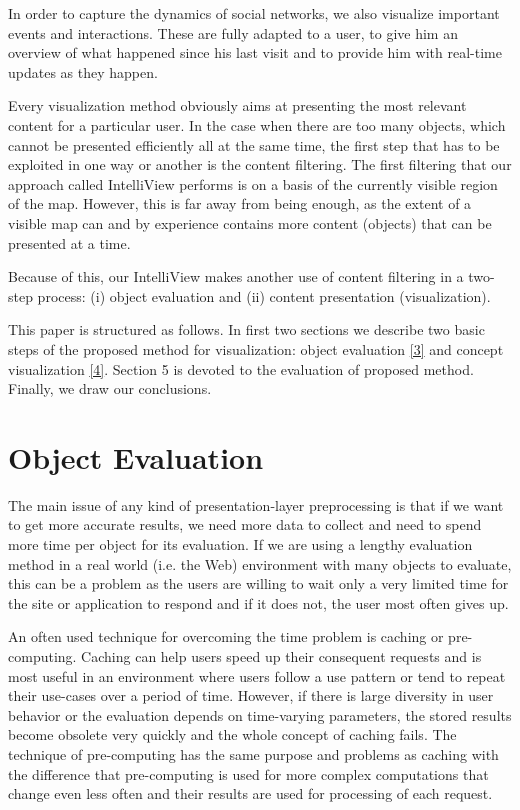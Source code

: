 \documentclass[10pt]{article}
\begin{document}
In order to capture the dynamics of social networks, we also visualize important events and interactions. These are fully adapted to a user, to give him an overview of what happened since his last visit and to provide him with real-time updates as they happen.

Every visualization method obviously aims at presenting the most relevant content for a particular user. In the case when there are too many objects, which cannot be presented efficiently all at the same time, the first step that has to be exploited in one way or another is the content filtering. The first filtering that our approach called IntelliView performs is on a basis of the currently visible region of the map. However, this is far away from being enough, as the extent of a visible map can and by experience contains more content (objects) that can be presented at a time.

Because of this, our IntelliView makes another use of content filtering in a two-step process: (i) object evaluation and (ii) content presentation (visualization).

This paper is structured as follows. In first two sections we describe two basic steps of the proposed method for visualization: object evaluation \ref{3} and concept visualization \ref{4}. Section 5 is devoted to the evaluation of proposed method. Finally, we draw our conclusions.



\section{Object Evaluation}
The main issue of any kind of presentation-layer preprocessing is that if we want to get more accurate results, we need more data to collect and need to spend more time per object for its evaluation. If we are using a lengthy evaluation method in a real world (i.e. the Web) environment with many objects to evaluate, this can be a problem as the users are willing to wait only a very limited time for the site or application to respond and if it does not, the user most often gives up.

An often used technique for overcoming the time problem is caching or pre-computing. Caching can help users speed up their consequent requests and is most useful in an environment where users follow a use pattern or tend to repeat their use-cases over a period of time. However, if there is large diversity in user behavior or the evaluation depends on time-varying parameters, the stored results become obsolete very quickly and the whole concept of caching fails. The technique of pre-computing has the same purpose and problems as caching with the difference that pre-computing is used for more complex computations that change even less often and their results are used for processing of each request.
\end{document}

